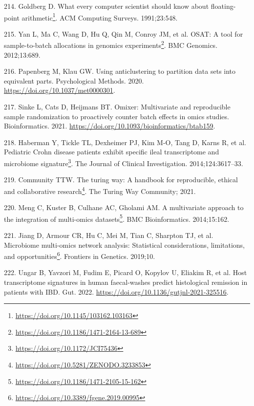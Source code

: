 \documentclass[
  a4paper,
]{book}
\DeclareRobustCommand{\href}[2]{#2\footnote{\url{#1}}}
\newlength{\cslhangindent}
\newlength{\cslentryspacingunit} %
\newenvironment{CSLReferences}[2] %
 {%
  \setlength{\parindent}{0pt}
  \ifodd #1
  \let\oldpar\par
  \def\par{\hangindent=\cslhangindent\oldpar}
  \fi
  \setlength{\parskip}{#2\cslentryspacingunit}
 }%
 {}
\begin{document}
\begin{CSLReferences}{0}{0}
\leavevmode{}%
214. Goldberg D. \href{https://doi.org/10.1145/103162.103163}{What every computer scientist should know about floating-point arithmetic}. ACM Computing Surveys. 1991;23:548.

\leavevmode{}%
215. Yan L, Ma C, Wang D, Hu Q, Qin M, Conroy JM, et al. \href{https://doi.org/10.1186/1471-2164-13-689}{OSAT: A tool for sample-to-batch allocations in genomics experiments}. BMC Genomics. 2012;13:689.

\leavevmode{}%
216. Papenberg M, Klau GW. Using anticlustering to partition data sets into equivalent parts. Psychological Methods. 2020. \url{https://doi.org/10.1037/met0000301}.

\leavevmode{}%
217. Sinke L, Cats D, Heijmans BT. Omixer: Multivariate and reproducible sample randomization to proactively counter batch effects in omics studies. Bioinformatics. 2021. \url{https://doi.org/10.1093/bioinformatics/btab159}.

\leavevmode{}%
218. Haberman Y, Tickle TL, Dexheimer PJ, Kim M-O, Tang D, Karns R, et al. \href{https://doi.org/10.1172/JCI75436}{Pediatric Crohn disease patients exhibit specific ileal transcriptome and microbiome signature}. The Journal of Clinical Investigation. 2014;124:3617--33.

\leavevmode{}%
219. Community TTW. \href{https://doi.org/10.5281/ZENODO.3233853}{The turing way: A handbook for reproducible, ethical and collaborative research}. The Turing Way Community; 2021.

\leavevmode{}%
220. Meng C, Kuster B, Culhane AC, Gholami AM. \href{https://doi.org/10.1186/1471-2105-15-162}{A multivariate approach to the integration of multi-omics datasets}. BMC Bioinformatics. 2014;15:162.

\leavevmode{}%
221. Jiang D, Armour CR, Hu C, Mei M, Tian C, Sharpton TJ, et al. \href{https://doi.org/10.3389/fgene.2019.00995}{Microbiome multi-omics network analysis: Statistical considerations, limitations, and opportunities}. Frontiers in Genetics. 2019;10.

\leavevmode{}%
222. Ungar B, Yavzori M, Fudim E, Picard O, Kopylov U, Eliakim R, et al. Host transcriptome signatures in human faecal-washes predict histological remission in patients with IBD. Gut. 2022. \url{https://doi.org/10.1136/gutjnl-2021-325516}.


\end{CSLReferences}
\end{document}
